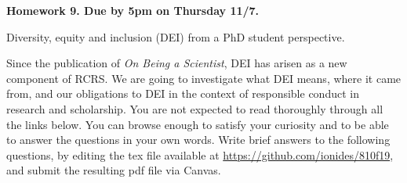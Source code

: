 \documentclass[12pt]{article}
\begin{document}
\begin{center}\bf
Homework 9. Due by 5pm on Thursday 11/7.

Diversity, equity and inclusion (DEI) from a PhD student perspective.

\end{center}

Since the publication of {\em On Being a Scientist}, DEI has arisen as a new component of RCRS. 
We are going to investigate what DEI means, where it came from, and our obligations to DEI in the context of responsible conduct in research and scholarship.
You are not expected to read thoroughly through all the links below.
You can browse enough to satisfy your curiosity and to be able to answer the questions in your own words.
Write brief answers to the following questions, by editing the tex file available at \url{https://github.com/ionides/810f19}, and submit the resulting pdf file via Canvas.
\end{document}
